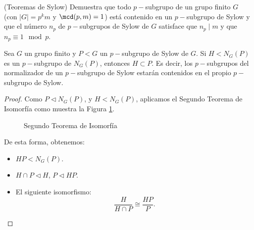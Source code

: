 \newpage
\begin{ejercicio}
    (Teoremas de Sylow) Demuestra que todo \(p-\)subgrupo de un grupo finito \(G\) (con \(|G| = p^k m\) y \(\mcd(p,m) = 1\)) está contenido en un \(p-\)subgrupo de Sylow y que el número \(n_p\) de \(p-\)subgrupos de Sylow de \(G\) satisface que \(n_p \mid m\) y que \(n_p \equiv 1 \mod p\).

    \begin{lema}
        Sea $G$ un grupo finito y \(P<G\) un \(p-\)subgrupo de Sylow de \(G\). Si $H<N_G(P)$ es un \(p-\)subgrupo de \(N_G(P)\), entonces \(H\subset P\). Es decir, los \(p-\)subgrupos del normalizador de un \(p-\)subgrupo de Sylow estarán contenidos en el propio \(p-\)subgrupo de Sylow.
        \begin{proof}
            Como $P\lhd N_G(P)$, y $H<N_G(P)$, aplicamos el Segundo Teorema de Isomorfía como muestra la Figura \ref{fig:segundo_teorema_isomorfia}.
            \begin{figure}[h]
                \centering
                \caption{Segundo Teorema de Isomorfía}
                \label{fig:segundo_teorema_isomorfia}
            \end{figure}

            De esta forma, obtenemos:
            \begin{itemize}
                \item $HP<N_G(P)$.
                \item $H\cap P\lhd H$, $P\lhd HP$.
                \item El siguiente isomorfismo:
                \begin{equation*}
                    \frac{H}{H\cap P} \cong \frac{HP}{P}.
                \end{equation*}
            \end{itemize}


\end{proof}
\end{lema}
\end{ejercicio}
